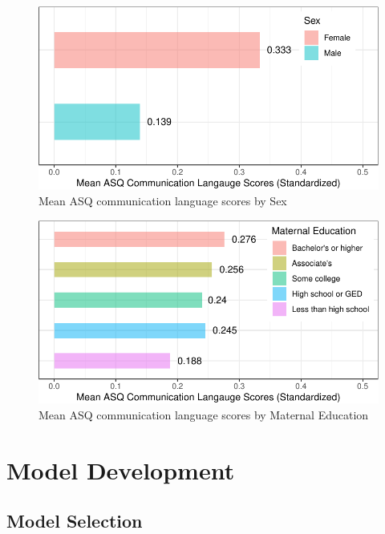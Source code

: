 \documentclass[sn-basic,pdflatex]{sn-jnl}
\begin{document}
\begin{figure}[H]

{\centering \includegraphics{HWC_progress-report-4_files/figure-latex/fig_bar_sex_ASQ-1} 

}

\caption{Mean ASQ communication language scores by Sex}\label{fig:fig_bar_sex_ASQ}
\end{figure}

\begin{figure}[H]

{\centering \includegraphics{HWC_progress-report-4_files/figure-latex/fig_bar_medu_ASQ-1} 

}

\caption{Mean ASQ communication language scores by Maternal Education}\label{fig:fig_bar_medu_ASQ}
\end{figure}

\section{Model Development}\label{model-development}

\subsection{Model Selection}\label{model-selection}
\end{document}
